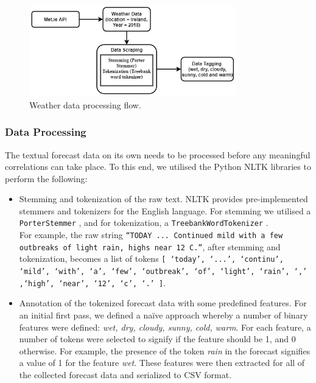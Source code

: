 \documentclass[a4paper,10pt]{article}
\begin{document}
    \begin{figure}
        \includegraphics[width=0.8\textwidth]{weather_process_flow.jpeg}
        \caption{Weather data processing flow.}
        \label{fig:weather_process_flow}
    \end{figure}


    \subsubsection{Data Processing}

    The textual forecast data on its own needs to be processed before any meaningful correlations can take place. To this end, we utilised the Python NLTK libraries to perform the following:
    \begin{itemize}
        \item{
            Stemming and tokenization of the raw text. NLTK provides pre-implemented stemmers and tokenizers for the English language. For stemming we utilised a \texttt{PorterStemmer} , and for tokenization, a \texttt{TreebankWordTokenizer} . \\
            For example, the raw string \texttt{``TODAY ... Continued mild with a few outbreaks of light rain, highs near 12 C.''}, after stemming and tokenization, becomes a list of tokens \texttt{[ `today', `...', `continu', `mild', `with', `a', `few', `outbreak', `of', `light', `rain', `,' ,`high', `near', `12', `c', `.' ]}.
        }
        \item{
            Annotation of the tokenized forecast data with some predefined features. For an initial first pass, we defined a na\"{i}ve approach whereby a number of binary features were defined: \textit{wet, dry, cloudy, sunny, cold, warm}. For each feature, a number of tokens were selected to signify if the feature should be 1, and 0 otherwise. For example, the presence of the token \textit{rain} in the forecast signifies a value of 1 for the feature \textit{wet}. These features were then extracted for all of the collected forecast data and serialized to CSV format.
        }
    \end{itemize}
\end{document}
